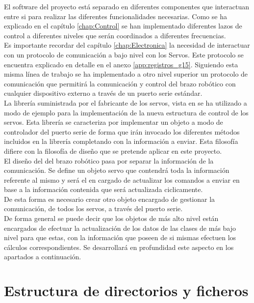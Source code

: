 El software del proyecto está separado en diferentes componentes que interactuan entre si para realizar las diferentes funcionalidades necesarias. Como se ha explicado en el capítulo \ref{chap:Control} se han implementado diferentes lazos de control a diferentes niveles que serán coordinados a diferentes frecuencias.
\\

Es importante recordar del capítulo \ref{chap:Electronica} la necesidad de interactuar con un protocolo de comunicación a bajo nivel con los Servos. Este protocolo se encuentra explicado en detalle en el anexo \ref{app:registros_g15}. Siguiendo esta misma línea de trabajo se ha implementado a otro nivel superior un protocolo de comunicación que permitirá la comunicación y control del brazo robótico con cualquier dispositivo externo a través de un puerto serie estándar.
\\

La librería suministrada por el fabricante de los servos, vista en \cite{} \completar se ha utilizado a modo de ejemplo para la implementación de la nueva estructura de control de los servos. Esta librería se caracteriza por implementar un objeto a modo de controlador del puerto serie de forma que irán invocado los diferentes métodos incluidos en la librería completando con la información a enviar. Esta filosofía difiere con la filosofía de diseño que se pretende aplicar en este proyecto.
\\

El diseño del  del brazo robótico pasa por separar la información de la comunicación. Se define un objeto servo que contendrá toda la información referente al mismo y será el en cargado de actualizar los comandos a enviar en base a la información contenida que será actualizada ciclicamente.
\\

De esta forma es necesario crear otro objeto encargado de gestionar la comunicación, de todos los servos, a través del puerto serie.
\\

De forma general se puede decir que los objetos de más alto nivel están encargados de efectuar la actualización de los datos de las clases de más bajo nivel para que estas, con la información que poseen de si mismas efectuen los cálculos correspondientes. Se desarrollará en profundidad este aspecto en los apartados a continuación.

\section{Estructura de directorios y ficheros} \label{sec:SW:estructura_dir}

